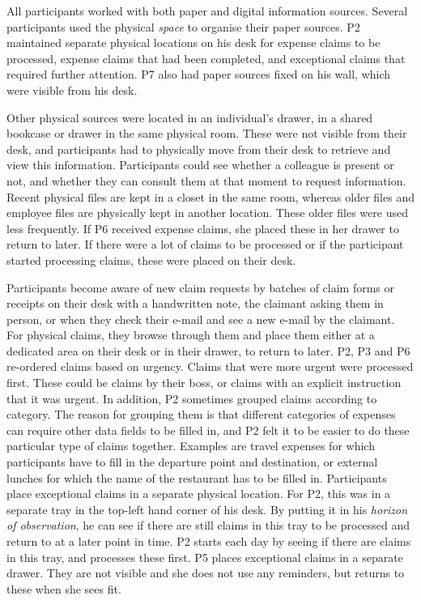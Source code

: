 
All participants worked with both paper and digital information sources. Several participants used the physical \textit{space} to organise their paper sources. P2 maintained separate physical locations on his desk for expense claims to be processed, expense claims that had been completed, and exceptional claims that required further attention. P7 also had paper sources fixed on his wall, which were visible from his desk. 

Other physical sources were located in an individual's drawer, in a shared bookcase or drawer in the same physical room. These were not visible from their desk, and participants had to physically move from their desk to retrieve and view this information. Participants could see whether a colleague is present or not, and whether they can consult them at that moment to request information. Recent physical files are kept in a closet in the same room, whereas older files and employee files are physically kept in another location. These older files were used less frequently.
If P6 received expense claims, she placed these in her drawer to return to later. If there were a lot of claims to be processed or if the participant started processing claims, these were placed on their desk. 

Participants become aware of new claim requests by batches of claim forms or receipts on their desk with a handwritten note, the claimant asking them in person, or when they check their e-mail and see a new e-mail by the claimant. For physical claims, they browse through them and place them either at a dedicated area on their desk or in their drawer, to return to later. P2, P3 and P6 re-ordered claims based on urgency. Claims that were more urgent were processed first. These could be claims by their boss, or claims with an explicit instruction that it was urgent. In addition, P2 sometimes grouped claims according to category. The reason for grouping them is that different categories of expenses can require other data fields to be filled in, and P2 felt it to be easier to do these particular type of claims together. Examples are travel expenses for which participants have to fill in the departure point and destination, or external lunches for which the name of the restaurant has to be filled in. Participants place exceptional claims in a separate physical location. For P2, this was in a separate tray in the top-left hand corner of his desk. By putting it in his \textit{horizon of observation}, he can see if there are still claims in this tray to be processed and return to at a later point in time. P2 starts each day by seeing if there are claims in this tray, and processes these first. P5 places exceptional claims in a separate drawer. They are not visible and she does not use any reminders, but returns to these when she sees fit.

